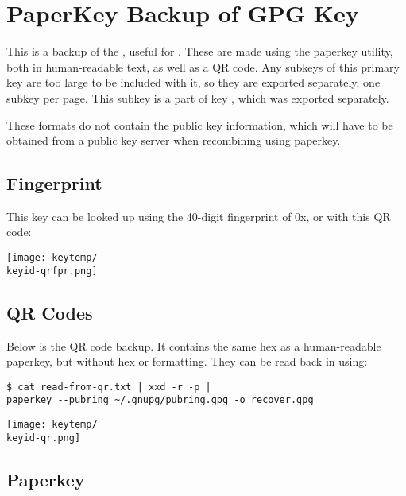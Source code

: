 \documentclass[10pt]{article}
\begin{document}
\section*{PaperKey Backup of GPG Key \keyid}

This is a backup of the \keytype \space \keyid, useful for \keyusage. These are made using the paperkey utility, both in human-readable text, as well as a QR code. 
\ifx\keyid\primarykey
Any subkeys of this primary key are too large to be included with it, so they are exported separately, one subkey per page.
\else
This subkey is a part of key \primarykey, which was exported separately.
\fi

These formats do not contain the public key information, which will have to be obtained from a public key server when recombining using paperkey.

\begin{multicols}{2}

\subsection*{Fingerprint}

This key can be looked up using the 40-digit fingerprint of \scriptsize 0x\keyfingerprint \normalsize, or with this QR code:

\begin{center}
\texttt{[image: keytemp/\\keyid-qrfpr.png]}
\end{center}

\subsection*{QR Codes}


Below is the QR code backup. It contains the same hex as a human-readable paperkey, but without hex or formatting. They can be read back in using:
\begin{lstlisting}
$ cat read-from-qr.txt | xxd -r -p | 
paperkey --pubring ~/.gnupg/pubring.gpg -o recover.gpg
\end{lstlisting}

\begin{center}
\texttt{[image: keytemp/\\keyid-qr.png]}
\end{center}

\columnbreak

\subsection*{Paperkey}



\end{multicols}
\end{document}
